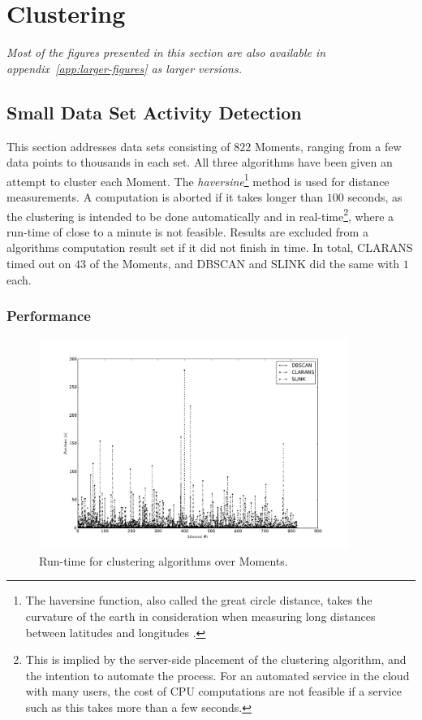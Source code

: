 \section{Clustering}
\emph{Most of the figures presented in this section are also available in 
appendix~\ref{app:larger-figures} as larger versions.}

\subsection{Small Data Set Activity Detection}
This section addresses data sets consisting of $822$ Moments, ranging 
from a few data points to thousands in each set. All three algorithms
have been given an attempt to cluster each Moment. The
\emph{haversine}\footnote{
    The haversine function, also called the great circle distance, 
    takes the curvature of the earth in consideration when measuring long
    distances between latitudes and longitudes \cite{haversine}.
} method is used for distance measurements. A computation is aborted if 
it takes longer than $100$ seconds, as the clustering is intended to be 
done automatically and in real-time\footnote{
    This is implied by the server-side placement of the clustering algorithm, and the intention to automate the process. For an automated service in the
    cloud with many users, the cost of CPU computations are not feasible
    if a service such as this takes more than a few seconds. 
}, where a run-time of close to a minute is not feasible. Results are 
excluded from a algorithms computation result set if it did not finish 
in time. In total, CLARANS timed out on $43$ of the Moments, and 
DBSCAN and SLINK did the same with $1$ each.

\subsubsection{Performance}

\begin{figure}[ht!]
    \centering
    \includegraphics[width=0.9\textwidth]{plots/moment_runtime_plot.pdf}
    \caption{Run-time for clustering algorithms over Moments.
    \label{fig:moment-runtime-plot} }
\end{figure}

